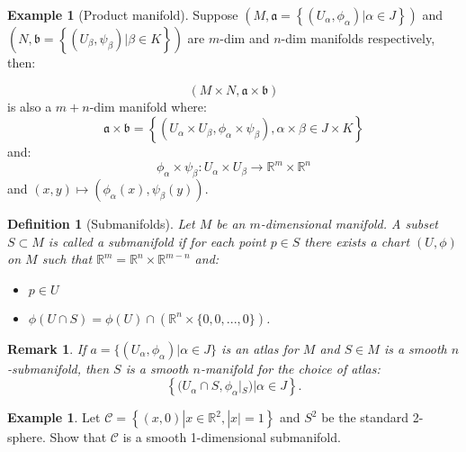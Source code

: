\documentclass{article}
\newtheorem{definition}[theorem]{Definition}
\newtheorem{remark}[theorem]{Remark}
\theoremstyle{definition}
\newtheorem{example}[theorem]{Example}
\numberwithin{theorem}{section}
\numberwithin{equation}{section}
\begin{document}
\begin{example}[Product manifold]
	Suppose $(M, \mathfrak{a} = \left\{ (U_{\alpha}, \phi_\alpha) | \alpha \in J \right\} )$ and $(N, \mathfrak{b} = \left\{ (U_{\beta}, \psi_\beta) | \beta \in K \right\} )$ are $m$-dim and $n$-dim manifolds respectively, then:
	
	\begin{equation}
		\left(M \times N, \mathfrak{a} \times \mathfrak{b} \right)
	\end{equation}
	is also a $m + n$-dim manifold where:
	\begin{equation}
		\mathfrak{a} \times \mathfrak{b} = \left\{ (U_\alpha \times U_\beta, \phi_\alpha \times \psi_\beta), \alpha \times \beta \in J \times K \right\}
	\end{equation}
	and: 
	\begin{equation}
		\phi_\alpha \times \psi_\beta : U_\alpha \times U_\beta \rightarrow \mathbb{R}^m \times \mathbb{R}^n
	\end{equation}
	and $(x, y) \mapsto (\phi_\alpha(x), \psi_\beta(y))$. 

\end{example}

\begin{definition}[Submanifolds]
	Let $M$ be an $m$-dimensional manifold. A subset $S \subset M$ is called a submanifold if for each point $p \in S$ there exists a chart $(U, \phi)$ on $M$ such that $\mathbb{R}^m = \mathbb{R}^n \times \mathbb{R}^{m - n}$ and:
	\begin{itemize}
		\item $p \in U$
		\item $\phi(U \cap S) = \phi(U) \cap (\mathbb{R}^n \times \{0, 0, ..., 0\})$.
	\end{itemize}
\end{definition}

\begin{remark}
	If $a = \{(U_\alpha, \phi_\alpha) | \alpha \in J\}$ is an atlas for $M$ and $S \in M$ is a smooth $n$-submanifold, then $S$ is a smooth $n$-manifold for the choice of atlas: 
	\begin{equation}
		\left\{ (U_{\alpha} \cap S, \phi_\alpha|_S) | \alpha \in J \right\}.
	\end{equation}
\end{remark}

\begin{example}
	Let $\mathcal{C} = \left\{(x, 0) | x \in \mathbb{R}^2 , |x| = 1\right\}$ and $S^2$ be the standard 2-sphere. Show that $\mathcal{C}$ is a smooth 1-dimensional submanifold. 
\end{example}
\end{document}
